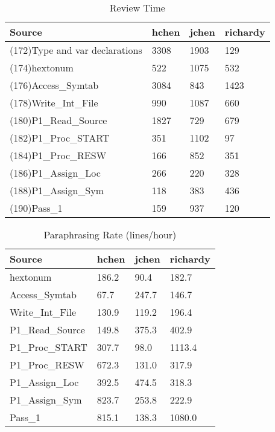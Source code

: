 \begin{table}[hb]
\begin{center}
\begin{tabular}{|l|l|l|l|}
\hline
Source & hchen & jchen & richardy\\
\hline
(172)Type and var declarations & 3308 & 1903 & 129\\
(174)hextonum & 522 & 1075 & 532\\
(176)Access\_Symtab & 3084 & 843 & 1423\\
(178)Write\_Int\_File & 990 & 1087 & 660\\
(180)P1\_Read\_Source & 1827 & 729 & 679\\
(182)P1\_Proc\_START & 351 & 1102 & 97\\
(184)P1\_Proc\_RESW & 166 & 852 & 351\\
(186)P1\_Assign\_Loc & 266 & 220 & 328\\
(188)P1\_Assign\_Sym & 118 & 383 & 436\\
(190)Pass\_1 & 159 & 937 & 120\\
\hline
\end{tabular}
\end{center}
\caption{Review Time}
\end{table}
\begin{table}[hb]
\begin{center}
\begin{tabular}{|l|l|l|l|}
\hline
Source & hchen & jchen & richardy\\
\hline
hextonum & 186.2 & 90.4 & 182.7\\
Access\_Symtab & 67.7 & 247.7 & 146.7\\
Write\_Int\_File & 130.9 & 119.2 & 196.4\\
P1\_Read\_Source & 149.8 & 375.3 & 402.9\\
P1\_Proc\_START & 307.7 & 98.0 & 1113.4\\
P1\_Proc\_RESW & 672.3 & 131.0 & 317.9\\
P1\_Assign\_Loc & 392.5 & 474.5 & 318.3\\
P1\_Assign\_Sym & 823.7 & 253.8 & 222.9\\
Pass\_1 & 815.1 & 138.3 & 1080.0\\
\hline
\end{tabular}
\end{center}
\caption{Paraphrasing Rate (lines/hour)}
\end{table}


